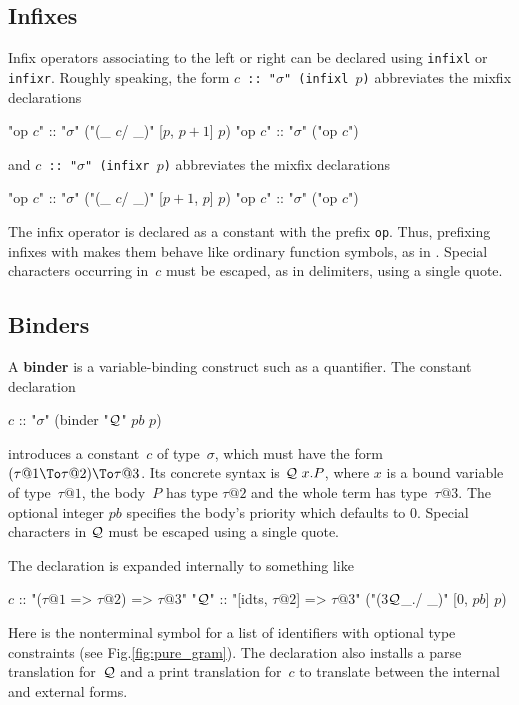 

\subsection{Infixes}

Infix operators associating to the left or right can be declared
using {\tt infixl} or {\tt infixr}.
Roughly speaking, the form {\tt $c$ ::\ "$\sigma$" (infixl $p$)}
abbreviates the mixfix declarations
\begin{ttbox}
"op \(c\)" :: "\(\sigma\)"   ("(_ \(c\)/ _)" [\(p\), \(p+1\)] \(p\))
"op \(c\)" :: "\(\sigma\)"   ("op \(c\)")
\end{ttbox}
and {\tt $c$ ::\ "$\sigma$" (infixr $p$)} abbreviates the mixfix declarations
\begin{ttbox}
"op \(c\)" :: "\(\sigma\)"   ("(_ \(c\)/ _)" [\(p+1\), \(p\)] \(p\))
"op \(c\)" :: "\(\sigma\)"   ("op \(c\)")
\end{ttbox}
The infix operator is declared as a constant with the prefix {\tt op}.
Thus, prefixing infixes with  makes them behave like ordinary
function symbols, as in \ML.  Special characters occurring in~$c$ must be
escaped, as in delimiters, using a single quote.


\subsection{Binders}
\begingroup
\def\Q{{\cal Q}}
A {\bf binder} is a variable-binding construct such as a quantifier.  The
constant declaration
\begin{ttbox}
\(c\) :: "\(\sigma\)"   (binder "\(\Q\)" \(pb\) \(p\))
\end{ttbox}
introduces a constant~$c$ of type~$\sigma$, which must have the form
$(\tau@1 \To \tau@2) \To \tau@3$.  Its concrete syntax is $\Q~x.P$, where
$x$ is a bound variable of type~$\tau@1$, the body~$P$ has type $\tau@2$
and the whole term has type~$\tau@3$. The optional integer $pb$
specifies the body's priority which defaults to 0.  Special characters
in $\Q$ must be escaped using a single quote.

The declaration is expanded internally to something like
\begin{ttbox}
\(c\)    :: "(\(\tau@1\) => \(\tau@2\)) => \(\tau@3\)"
"\(\Q\)"\hskip-3pt  :: "[idts, \(\tau@2\)] => \(\tau@3\)"   ("(3\(\Q\)_./ _)" [0, \(pb\)] \(p\))
\end{ttbox}
Here  is the nonterminal symbol for a list of identifiers with
optional type constraints (see Fig.\ts\ref{fig:pure_gram}).  The
declaration also installs a parse translation
for~$\Q$ and a print translation for~$c$ to
translate between the internal and external forms.

